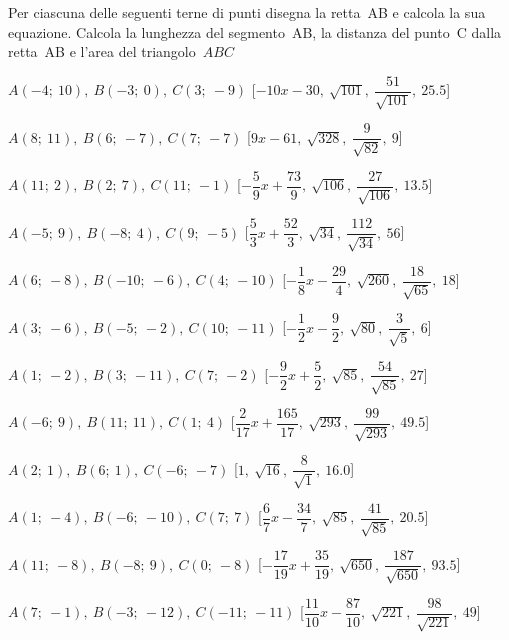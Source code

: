 \begin{esercizio}\label{ese:}
 Per ciascuna delle seguenti terne di 
punti disegna la retta~AB e calcola la sua equazione. 
Calcola la lunghezza del segmento~AB, la distanza del punto~C dalla retta~AB 
e l'area del triangolo~$ABC$
 \begin{enumeratea}
  \item  $A(-4;~10),~B(-3;~0),~C(3;~-9)$ \hfill 
   [$-10 x -30,~\sqrt{101},~\dfrac{51}{\sqrt{101}},~25.5$]
  \item  $A(8;~11),~B(6;~-7),~C(7;~-7)$ \hfill 
   [$9 x -61,~\sqrt{328},~\dfrac{9}{\sqrt{82}},~9$]
  \item  $A(11;~2),~B(2;~7),~C(11;~-1)$ \hfill 
   [$-\dfrac{5}{9} x +\dfrac{73}{9},~\sqrt{106},~\dfrac{27}{\sqrt{106}},~13.5$]
  \item  $A(-5;~9),~B(-8;~4),~C(9;~-5)$ \hfill 
   [$\dfrac{5}{3} x +\dfrac{52}{3},~\sqrt{34},~\dfrac{112}{\sqrt{34}},~56$]
  \item  $A(6;~-8),~B(-10;~-6),~C(4;~-10)$ \hfill 
   [$-\dfrac{1}{8} x -\dfrac{29}{4},~\sqrt{260},~\dfrac{18}{\sqrt{65}},~18$]
  \item  $A(3;~-6),~B(-5;~-2),~C(10;~-11)$ \hfill 
   [$-\dfrac{1}{2} x -\dfrac{9}{2},~\sqrt{80},~\dfrac{3}{\sqrt{5}},~6$]
  \item  $A(1;~-2),~B(3;~-11),~C(7;~-2)$ \hfill 
   [$-\dfrac{9}{2} x +\dfrac{5}{2},~\sqrt{85},~\dfrac{54}{\sqrt{85}},~27$]
  \item  $A(-6;~9),~B(11;~11),~C(1;~4)$ \hfill 
   [$\dfrac{2}{17} x 
+\dfrac{165}{17},~\sqrt{293},~\dfrac{99}{\sqrt{293}},~49.5$]
  \item  $A(2;~1),~B(6;~1),~C(-6;~-7)$ \hfill 
   [$1,~\sqrt{16},~\dfrac{8}{\sqrt{1}},~16.0$]
  \item  $A(1;~-4),~B(-6;~-10),~C(7;~7)$ \hfill 
   [$\dfrac{6}{7} x -\dfrac{34}{7},~\sqrt{85},~\dfrac{41}{\sqrt{85}},~20.5$]
  \item  $A(11;~-8),~B(-8;~9),~C(0;~-8)$ \hfill 
   [$-\dfrac{17}{19} x 
+\dfrac{35}{19},~\sqrt{650},~\dfrac{187}{\sqrt{650}},~93.5$]
  \item  $A(7;~-1),~B(-3;~-12),~C(-11;~-11)$ \hfill 
   [$\dfrac{11}{10} x -\dfrac{87}{10},~\sqrt{221},~\dfrac{98}{\sqrt{221}},~49$]

\end{enumeratea}
\end{esercizio}

